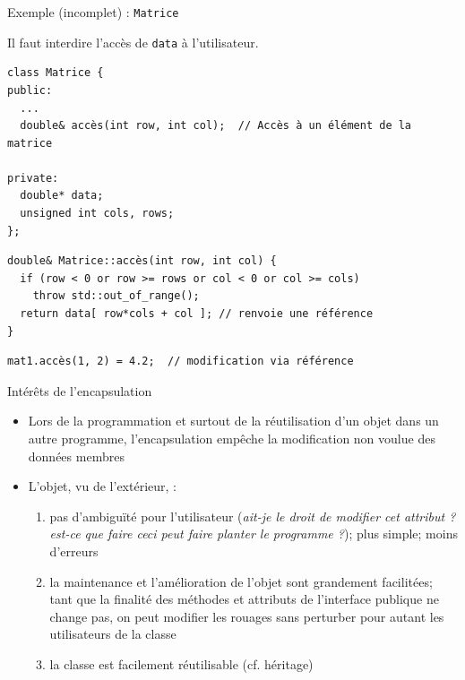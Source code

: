 \documentclass[c]{beamer}
\begin{document}

\begin{frame}[fragile]{Exemple (incomplet) : \texttt{Matrice}}

Il faut interdire l'accès de \texttt{data} à l'utilisateur.
\vspace{1em}
\begin{verbatim}
class Matrice {
public:
  ...
  double& accès(int row, int col);  // Accès à un élément de la matrice

private:
  double* data;
  unsigned int cols, rows;
};
\end{verbatim}
\pause
\vspace{1em}
\begin{verbatim}
double& Matrice::accès(int row, int col) {
  if (row < 0 or row >= rows or col < 0 or col >= cols)
    throw std::out_of_range();
  return data[ row*cols + col ]; // renvoie une référence
}
\end{verbatim}
\pause
\vspace{1em}
\begin{verbatim}
mat1.accès(1, 2) = 4.2;  // modification via référence
\end{verbatim}

\end{frame}


\begin{frame}[fragile]{Intérêts de l'encapsulation}
\begin{itemize}
\item Lors de la programmation et surtout de la réutilisation d'un objet dans un
autre programme, l'encapsulation empêche la modification non voulue des données
membres

\item L'objet, vu de l'extérieur, \pause :

\begin{enumerate}[<+->]
\item pas d'ambiguïté pour l'utilisateur (\textit{ait-je le droit de modifier cet attribut ?} \textit{est-ce que faire ceci peut faire planter le programme ?}); plus simple; moins d'erreurs
\item la maintenance et l'amélioration de l'objet sont grandement facilitées; tant que la finalité des méthodes et attributs de l'interface publique ne change pas, on peut modifier les rouages sans perturber pour autant les utilisateurs de la classe
\item la classe est facilement réutilisable (cf. héritage)
\end{enumerate}
\end{itemize}
\end{frame}
\end{document}

